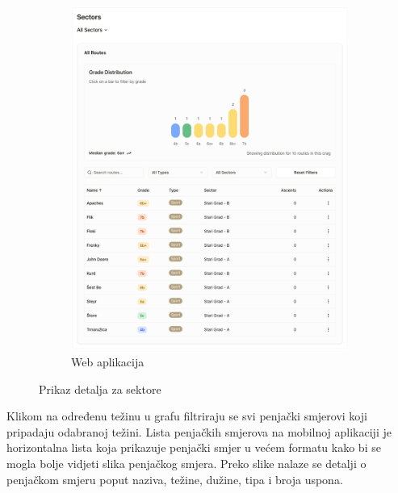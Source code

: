 \begin{figure}[H]
\begin{subfigure}[b]{0.55\textwidth}
        \centering
        \includegraphics[width=1\textwidth]{images/implementacija/web/crag-details/crag-all-sectors.png}
        \caption{Web aplikacija}
        \label{fig:prikaz_detalja_za_sektore_web}
    \end{subfigure}
    \caption{Prikaz detalja za sektore}
    \label{fig:prikaz_detalja_za_sektore}
\end{figure}

Klikom na određenu težinu u grafu filtriraju se svi penjački smjerovi koji pripadaju odabranoj težini. Lista penjačkih smjerova na mobilnoj aplikaciji je horizontalna lista koja prikazuje penjački smjer u većem formatu kako bi se mogla bolje vidjeti slika penjačkog smjera. Preko slike nalaze se detalji o penjačkom smjeru poput naziva, težine, dužine, tipa i broja uspona.

